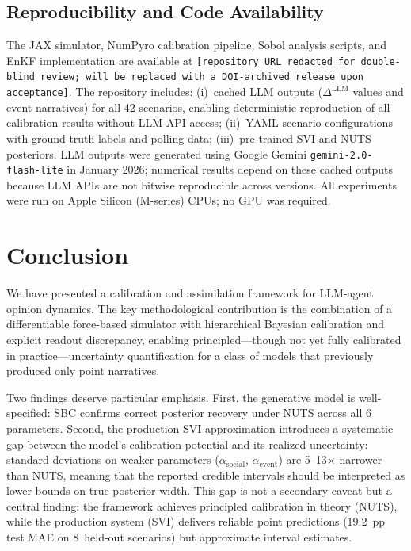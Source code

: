 \documentclass[12pt]{article}
\begin{document}
\subsection{Reproducibility and Code Availability}

The JAX simulator, NumPyro calibration pipeline, Sobol analysis scripts, and EnKF implementation are available at \texttt{[repository URL redacted for double-blind review; will be replaced with a DOI-archived release upon acceptance]}. The repository includes: (i)~cached LLM outputs ($\Delta^{\text{LLM}}$ values and event narratives) for all 42 scenarios, enabling deterministic reproduction of all calibration results without LLM API access; (ii)~YAML scenario configurations with ground-truth labels and polling data; (iii)~pre-trained SVI and NUTS posteriors. LLM outputs were generated using Google Gemini \texttt{gemini-2.0-flash-lite} in January 2026; numerical results depend on these cached outputs because LLM APIs are not bitwise reproducible across versions. All experiments were run on Apple Silicon (M-series) CPUs; no GPU was required.

\section{Conclusion}
\label{sec:conclusion}

We have presented a calibration and assimilation framework for LLM-agent opinion dynamics. The key methodological contribution is the combination of a differentiable force-based simulator with hierarchical Bayesian calibration and explicit readout discrepancy, enabling principled---though not yet fully calibrated in practice---uncertainty quantification for a class of models that previously produced only point narratives.

Two findings deserve particular emphasis. First, the generative model is well-specified: SBC confirms correct posterior recovery under NUTS across all 6 parameters. Second, the production SVI approximation introduces a systematic gap between the model's calibration potential and its realized uncertainty: standard deviations on weaker parameters ($\alpha_{\text{social}}$, $\alpha_{\text{event}}$) are 5--13$\times$ narrower than NUTS, meaning that the reported credible intervals should be interpreted as lower bounds on true posterior width. This gap is not a secondary caveat but a central finding: the framework achieves principled calibration in theory (NUTS), while the production system (SVI) delivers reliable point predictions (19.2~pp test MAE on 8~held-out scenarios) but approximate interval estimates.
\end{document}
